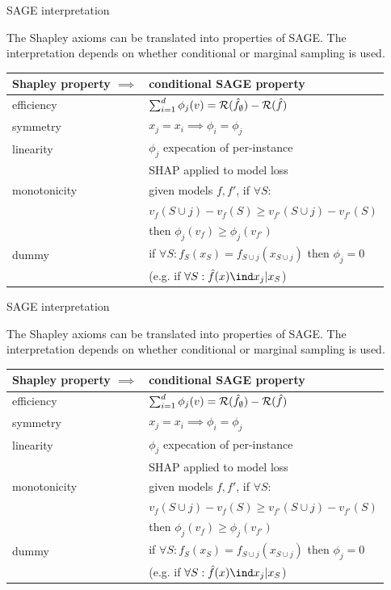 \documentclass[11pt,compress,t,notes=noshow, xcolor=table]{beamer}
\begin{document}
\begin{vbframe}{SAGE interpretation}

The Shapley axioms can be translated into properties of SAGE. The interpretation depends on whether conditional or marginal sampling is used.
%
\begin{table}
  \centering
  \begin{tabular}{l | l }
  Shapley property $\implies$ & conditional SAGE property \\
  \hline
  efficiency & $\sum_{i=1}^d \phi_j(v) = \risk(\fh_\emptyset) - \risk(\fh)$\\
  symmetry & $x_j = x_i \implies \phi_i = \phi_j$ \\
  linearity & $\phi_j$ expecation of per-instance\\
  & SHAP applied to model loss\\
  monotonicity & given models $f, f'$, if  $\forall S:$\\
  &$v_f(S \cup j) - v_f(S) \geq v_{f'}(S \cup j) - v_{f'}(S)$ \\
  &then $\phi_j(v_f) \geq \phi_j(v_{f'})$\\
  dummy & if $ \forall S: f_S(x_S) = f_{S \cup j}(x_{S \cup j})$ then $\phi_j = 0$ \\
  & (e.g. if $\forall S: \fh(x) \ind x_j | x_S$)
  \end{tabular}
\end{table}

\end{vbframe}

\begin{vbframe}{SAGE interpretation}

The Shapley axioms can be translated into properties of SAGE. The interpretation depends on whether conditional or marginal sampling is used.
%
\begin{table}
  \centering
  \begin{tabular}{l | l }
  Shapley property $\implies$ & conditional SAGE property \\
  \hline
  efficiency & $\sum_{i=1}^d \phi_j(v) = \risk(\fh_\emptyset) - \risk(\fh)$\\
  symmetry & $x_j = x_i \implies \phi_i = \phi_j$ \\
  linearity & $\phi_j$ expecation of per-instance\\
  & SHAP applied to model loss\\
  monotonicity & given models $f, f'$, if  $\forall S:$\\
  &$v_f(S \cup j) - v_f(S) \geq v_{f'}(S \cup j) - v_{f'}(S)$ \\
  &then $\phi_j(v_f) \geq \phi_j(v_{f'})$\\
  dummy & if $ \forall S: f_S(x_S) = f_{S \cup j}(x_{S \cup j})$ then $\phi_j = 0$ \\
  & (e.g. if $\forall S: \fh(x) \ind x_j | x_S$)
  \end{tabular}
\end{table}

\end{vbframe}
\end{document}
